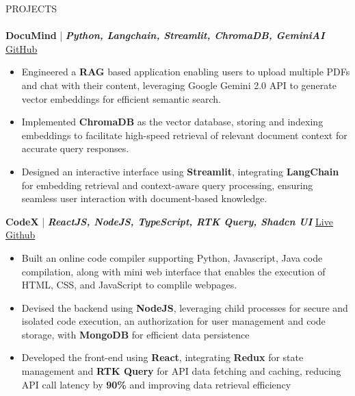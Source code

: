 \documentclass[a4paper]{article}
\newcommand{\lineunder} {
    \vspace*{-8pt} \\
    \hspace*{-18pt} \hrulefill \\
}
\newcommand{\header} [1] {
    {\hspace*{-18pt}\vspace*{6pt} \textsc{#1}}
    \vspace*{-6pt} \lineunder
}
\begin{document}
\header{PROJECTS}

{\textbf{DocuMind}} {| \sl \textbf{Python, Langchain, Streamlit, ChromaDB, GeminiAI }} \hfill \href{https://github.com/Aryan123-rgb/rag-pdf-chat#}{\color{blue}GitHub} 
\begin{itemize}
    \vspace{-0.5mm}
    \item Engineered a \textbf{RAG} based application enabling users to upload multiple PDFs and chat with their content, leveraging Google Gemini 2.0 API to generate vector embeddings for efficient semantic search.
    \vspace{-1mm}
    \item Implemented \textbf{ChromaDB} as the vector database, storing and indexing embeddings to facilitate high-speed retrieval of relevant document context for accurate query responses.
     \vspace{-1mm}
    \item Designed an interactive interface using \textbf{Streamlit}, integrating \textbf{LangChain} for embedding retrieval and context-aware query processing, ensuring seamless user interaction with document-based knowledge.
\end{itemize}

{\textbf{CodeX}} {| \sl \textbf{ReactJS, NodeJS, TypeScript, RTK Query, Shadcn UI}} \hfill\href{https://codex-juggernaut.netlify.app}{\color{blue}Live} \hspace{3pt} \href{https://github.com/Aryan123-rgb/codex}{\color{blue}Github}  \\
\begin{itemize}
    \vspace{-0.5mm}
 \item Built an online code compiler supporting Python, Javascript, Java code compilation, along with mini web interface that enables the execution of HTML, CSS, and JavaScript to complile webpages.
    \item  Devised the backend using \textbf{NodeJS}, leveraging child processes for secure and isolated code execution, an authorization for user management and code storage, with \textbf{MongoDB} for efficient data persistence
    \vspace{-1mm}
    \item Developed the front-end using \textbf{React}, integrating \textbf{Redux} for state management and \textbf{RTK Query} for API data fetching and caching, reducing API call latency by \textbf{90\%} and improving data retrieval efficiency
\end{itemize}
\end{document}
